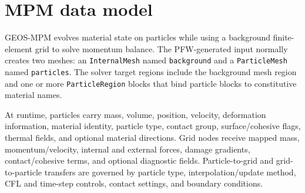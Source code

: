 \section{MPM data model}
GEOS-MPM evolves material state on particles while using a background finite-element grid to solve momentum balance.  The PFW-generated input normally creates two meshes: an \texttt{InternalMesh} named \texttt{background} and a \texttt{ParticleMesh} named \texttt{particles}.  The solver target regions include the background mesh region and one or more \texttt{ParticleRegion} blocks that bind particle blocks to constitutive material names.

At runtime, particles carry mass, volume, position, velocity, deformation information, material identity, particle type, contact group, surface/cohesive flags, thermal fields, and optional material directions.  Grid nodes receive mapped mass, momentum/velocity, internal and external forces, damage gradients, contact/cohesive terms, and optional diagnostic fields.  Particle-to-grid and grid-to-particle transfers are governed by particle type, interpolation/update method, CFL and time-step controls, contact settings, and boundary conditions.
